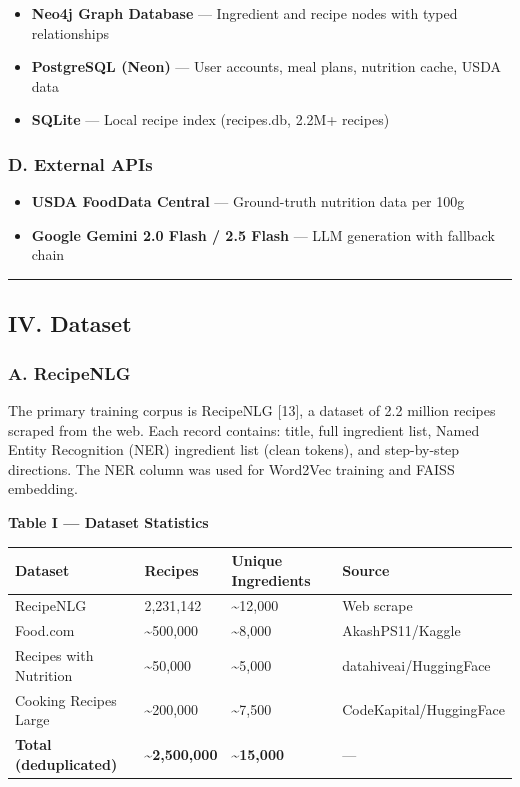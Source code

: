 \documentclass[10pt,conference,compsoc]{IEEEtran}
\begin{document}
\begin{itemize}
\tightlist
\item
  \textbf{Neo4j Graph Database} --- Ingredient and recipe nodes with
  typed relationships
\item
  \textbf{PostgreSQL (Neon)} --- User accounts, meal plans, nutrition
  cache, USDA data
\item
  \textbf{SQLite} --- Local recipe index (recipes.db, 2.2M+ recipes)
\end{itemize}

\subsubsection{D. External APIs}\label{d.-external-apis}

\begin{itemize}
\tightlist
\item
  \textbf{USDA FoodData Central} --- Ground-truth nutrition data per
  100g
\item
  \textbf{Google Gemini 2.0 Flash / 2.5 Flash} --- LLM generation with
  fallback chain
\end{itemize}

\begin{center}\rule{0.5\linewidth}{0.5pt}\end{center}

\subsection{IV. Dataset}\label{iv.-dataset}

\subsubsection{A. RecipeNLG}\label{a.-recipenlg}

The primary training corpus is RecipeNLG {[}13{]}, a dataset of 2.2
million recipes scraped from the web. Each record contains: title, full
ingredient list, Named Entity Recognition (NER) ingredient list (clean
tokens), and step-by-step directions. The NER column was used for
Word2Vec training and FAISS embedding.

\textbf{Table I --- Dataset Statistics}

\begin{longtable}[]{@{}llll@{}}
\toprule\noalign{}
Dataset & Recipes & Unique Ingredients & Source \\
\midrule\noalign{}
\endhead
\bottomrule\noalign{}
\endlastfoot
RecipeNLG & 2,231,142 & \textasciitilde12,000 & Web scrape \\
Food.com & \textasciitilde500,000 & \textasciitilde8,000 &
AkashPS11/Kaggle \\
Recipes with Nutrition & \textasciitilde50,000 & \textasciitilde5,000 &
datahiveai/HuggingFace \\
Cooking Recipes Large & \textasciitilde200,000 & \textasciitilde7,500 &
CodeKapital/HuggingFace \\
\textbf{Total (deduplicated)} & \textbf{\textasciitilde2,500,000} &
\textbf{\textasciitilde15,000} & --- \\
\end{longtable}
\end{document}
